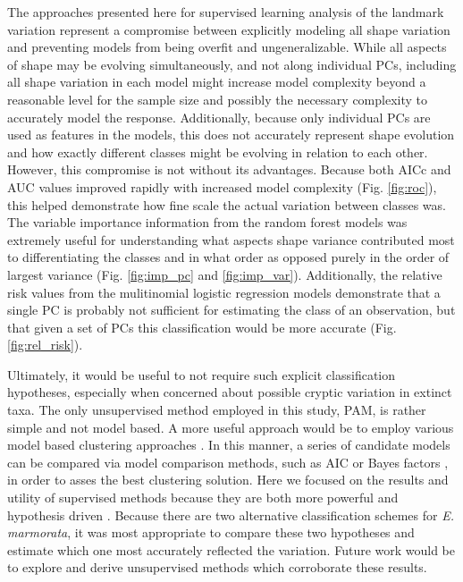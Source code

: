 \documentclass[12pt,letterpaper]{article}\usepackage{graphicx, color}
\begin{document}
The approaches presented here for supervised learning analysis of the landmark variation represent a compromise between explicitly modeling all shape variation and preventing models from being overfit and ungeneralizable. While all aspects of shape may be evolving simultaneously, and not along individual PCs, including all shape variation in each model might increase model complexity beyond a reasonable level for the sample size and possibly the necessary complexity to accurately model the response. Additionally, because only individual PCs are used as features in the models, this does not accurately represent shape evolution and how exactly different classes might be evolving in relation to each other. However, this compromise is not without its advantages. Because both AICc and AUC values improved rapidly with increased model complexity (Fig. \ref{fig:roc}), this helped demonstrate how fine scale the actual variation between classes was. The variable importance information from the random forest models was extremely useful for understanding what aspects shape variance contributed most to differentiating the classes and in what order as opposed purely in the order of largest variance (Fig. \ref{fig:imp_pc} and \ref{fig:imp_var}). Additionally, the relative risk values from the mulitinomial logistic regression models demonstrate that a single PC is probably not sufficient for estimating the class of an observation, but that given a set of PCs this classification would be more accurate (Fig. \ref{fig:rel_risk}).

Ultimately, it would be useful to not require such explicit classification hypotheses, especially when concerned about possible cryptic variation in extinct taxa. The only unsupervised method employed in this study, PAM, is rather simple and not model based. A more useful approach would be to employ various model based clustering approaches \citep{Fraley2002,Zhong2003}. In this manner, a series of candidate models can be compared via model comparison methods, such as AIC or Bayes factors \citep{Fraley2002}, in order to asses the best clustering solution. %
Here we focused on the results and utility of supervised methods because they are both more powerful and hypothesis driven \citep{Hastie2009}. Because there are two alternative classification schemes for \textit{E. marmorata}, it was most appropriate to compare these two hypotheses and estimate which one most accurately reflected the variation. Future work would be to explore and derive unsupervised methods which corroborate these results.
\end{document}
